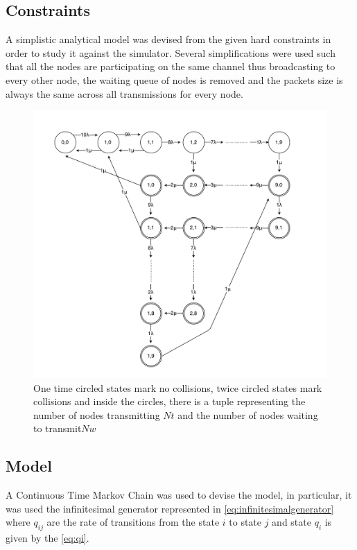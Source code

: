 \documentclass[conference]{IEEEtran}
\begin{document}
\subsection{Constraints}\label{sec:constraints}
A simplistic analytical model was devised from the given hard constraints in order to study it against the simulator. Several simplifications were used such that all the nodes are participating on the same channel thus broadcasting to every other node, the waiting queue of nodes is removed and the packets size is always the same across all transmissions for every node. 

\begin{figure}[t]
    \centering
    \includegraphics[width=\columnwidth]{graphs/MCTS}
    \caption{One time circled states mark no collisions, twice circled states mark collisions and inside the circles, there is a tuple representing the number of nodes transmitting \(Nt\) and the number of nodes waiting to transmit\(Nw\)}
    \label{fig:mcts}
\end{figure}

\subsection{Model}\label{sec:model}
A Continuous Time Markov Chain was used to devise the model, in particular, it was used the infinitesimal generator represented in \cref{eq:infinitesimalgenerator} where \(q_{ij}\) are the rate of transitions from the state \(i\) to state \(j\) and state \(q_i\) is given by the \cref{eq:qi}.
\end{document}
